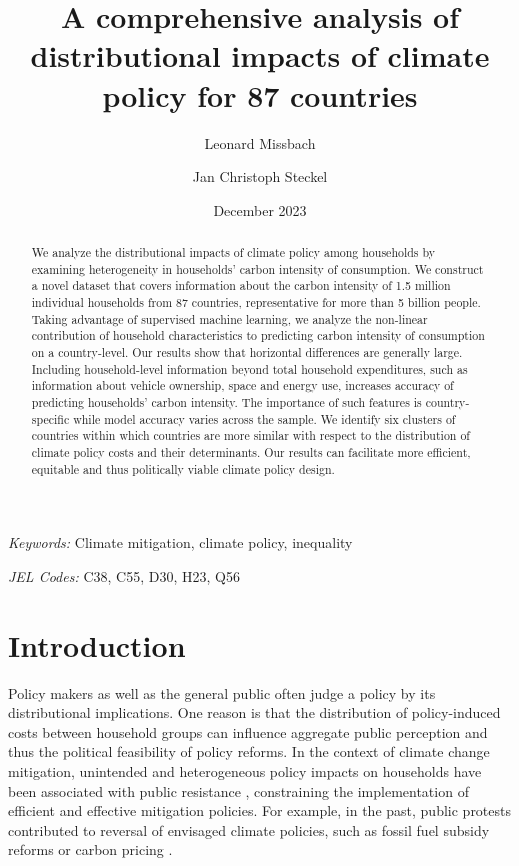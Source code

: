 \documentclass[12pt, a4paper]{article}
\title{A comprehensive analysis of distributional impacts of climate policy for 87 countries
}
\author[1,2,*]{Leonard Missbach}
\author[1,3]{Jan Christoph Steckel}
\affil[1]{\small Mercator Research Institute on Global Commons and Climate Change, Berlin, Germany}
\affil[2]{\small Technical University of Berlin, Berlin, Germany}
\affil[3]{\small Brandenburg University of Technology Cottbus Senftenberg, Cottbus, Germany}
\affil[*]{\normalsize Corresponding author: \href{mailto:missbach@mcc-berlin.net}{missbach@mcc-berlin.net}}
\date{December 2023}
\begin{document}
\maketitle
\begin{abstract}
  We analyze the distributional impacts of climate policy among households by examining heterogeneity in households' carbon intensity of consumption. We construct a novel dataset that covers information about the carbon intensity of 1.5 million individual households from 87 countries, representative for more than 5 billion people. Taking advantage of supervised machine learning, we analyze the non-linear contribution of household characteristics to predicting carbon intensity of consumption on a country-level.
   Our results show that horizontal differences are generally large. Including household-level information beyond total household expenditures, such as information about vehicle ownership, space and energy use, increases accuracy of predicting households' carbon intensity. The importance of such features is country-specific while model accuracy varies across the sample. We identify six clusters of countries within which countries are more similar with respect to the distribution of climate policy costs and their determinants. Our results can facilitate more efficient, equitable and thus politically viable climate policy design.   
\end{abstract}

\smallskip

\noindent \small \textit{Keywords:} Climate mitigation, climate policy, inequality

\noindent \small \textit{JEL Codes:} C38, C55, D30, H23, Q56

\thispagestyle{empty}
\clearpage
\setcounter{page}{1}

\normalsize

\section{Introduction} \label{sec:introduction}

Policy makers as well as the general public often judge a policy by its distributional implications. One reason is that the distribution of policy-induced costs between household groups can influence aggregate public perception and thus the political feasibility of policy reforms. In the context of climate change mitigation, unintended and heterogeneous policy impacts on households have been associated with public resistance \autocite{MaestreAndres.2019,Dechezlepretre.2022}, constraining the implementation of efficient and effective mitigation policies. For example, in the past, public protests contributed to reversal of envisaged climate policies, such as fossil fuel subsidy reforms \autocite{Clements.2013} or carbon pricing \autocite{Douenne.2020c}.
\end{document}
